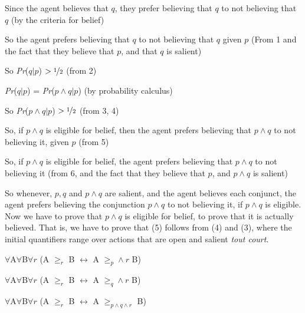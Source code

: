 \begin{enumerate*}
\item Since the agent believes that \(q\), they prefer believing that \(q\) to not believing that \(q\) (by the criteria for belief)
\item So the agent prefers believing that \(q\) to not believing that \(q\) given \(p\) (From 1 and the fact that they believe that \(p\), and that \(q\) is salient)
\item So \textit{Pr}(\(q | p\)) \(> \nicefrac{1}{2}\) (from 2)
\item \textit{Pr}(\(q | p\)) = \textit{Pr}(\(p \wedge q | p\)) (by probability calculus)
\item So \textit{Pr}(\(p \wedge q | p\)) \(> \nicefrac{1}{2}\) (from 3, 4)
\item So, if \(p \wedge q\) is eligible for belief, then the agent prefers believing that \(p \wedge q\) to not believing it, given \(p\) (from 5)
\item So, if \(p \wedge q\) is eligible for belief, the agent prefers believing that \(p \wedge q\) to not believing it (from 6, and the fact that they believe that \(p\), and \(p \wedge q\) is salient)
\end{enumerate*}

\noindent So whenever, \(p, q\) and \(p \wedge q\) are salient, and the agent believes each conjunct, the agent prefers believing the conjunction \(p \wedge q\) to not believing it, if \(p \wedge q\) is eligible. Now we have to prove that \(p \wedge q\) is eligible for belief, to prove that it is actually believed. That is, we have to prove that (5) follows from (4) and (3), where the initial quantifiers range over actions that are open and salient \textit{tout court}.

\begin{enumerate*}
\renewcommand{\labelenumi}{(\arabic{enumi})}
\setcounter{enumi}{2}
\item \(\forall\)A\(\forall\)B\(\forall r\) (A \(\geq_r\) B \(\leftrightarrow\) A \(\geq _p  \wedge r\) B)
\item \(\forall\)A\(\forall\)B\(\forall r\) (A \(\geq_r\) B \(\leftrightarrow\) A \(\geq _q  \wedge r\) B)
\item \(\forall\)A\(\forall\)B\(\forall r\) (A \(\geq_r\) B \(\leftrightarrow\) A \(\geq _{p \wedge q \wedge r}\) B)
\end{enumerate*}

